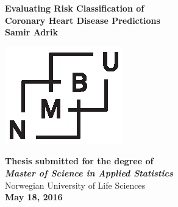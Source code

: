 \documentclass[../thesis.tex]{subfiles}
\begin{document}
\begin{titlepage}
\begin{center}
\vspace*{0,8cm}\LARGE{\textbf{Evaluating Risk Classification of \\Coronary Heart Disease Predictions}}\\[0,4cm]

\vspace*{1,5cm}\Large{\textbf{Samir Adrik}}

\vspace*{3cm}\includegraphics[scale=1.5]{../images/NMBU.eps}

\vspace{1cm}\large{\textbf{Thesis submitted for the degree of\\ \textit{Master of Science in Applied Statistics}}}\\[0,5cm]

\large{Norwegian University of Life Sciences}\\[0,5cm]

\large{\textbf{May 18, 2016}}
\end{center}
\end{titlepage}
\end{document}
